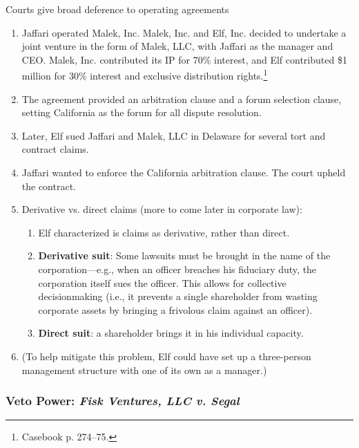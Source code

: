 Courts give broad deference to operating agreements 

\begin{enumerate}
    \item Jaffari operated Malek, Inc. Malek, Inc. and Elf, Inc. decided to 
    undertake a joint venture in the form of Malek, LLC, with Jaffari as the 
    manager and CEO. Malek, Inc. contributed its IP for 70\% interest, and Elf 
    contributed \$1 million for 30\% interest and exclusive distribution 
    rights.\footnote{Casebook p. 274--75.}
    \item The agreement provided an arbitration clause and a forum selection 
    clause, setting California as the forum for all dispute resolution.
    \item Later, Elf sued Jaffari and Malek, LLC in Delaware for several tort 
    and contract claims.
    \item Jaffari wanted to enforce the California arbitration clause. The 
    court upheld the contract.
    \item Derivative vs. direct claims (more to come later in corporate law):
    \begin{enumerate}
        \item Elf characterized is claims as derivative, rather than direct.
        \item \textbf{Derivative suit}: Some lawsuits must be brought in the 
        name of the corporation---e.g., when an officer breaches his fiduciary 
        duty, the corporation itself sues the officer. This allows for 
        collective decisionmaking (i.e., it prevents a single shareholder from 
        wasting corporate assets by bringing a frivolous claim against an 
        officer).
        \item \textbf{Direct suit}: a shareholder brings it in his individual 
        capacity.
    \end{enumerate}
    \item (To help mitigate this problem, Elf could have set up a three-person 
    management structure with one of its own as a manager.)
\end{enumerate}

\subsubsection{Veto Power: \emph{Fisk Ventures, LLC v. Segal}}

